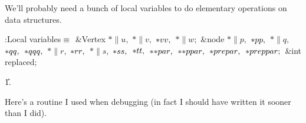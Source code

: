 We'll probably need a bunch of local variables to do elementary operations
on
data structures.

\Y\B\4:Local variables\X${}\equiv{}$\6
\&{Vertex} ${}{*}\|u,{}$ ${}{*}\|v,{}$ ${}{*}\\{vv},{}$ ${}{*}\|w;{}$\6
\&{node} ${}{*}\|p,{}$ ${}{*}\\{pp},{}$ ${}{*}\|q,{}$ ${}{*}\\{qq},{}$ ${}{*}%
\\{qqq},{}$ ${}{*}\|r,{}$ ${}{*}\\{rr},{}$ ${}{*}\|s,{}$ ${}{*}\\{ss},{}$
${}{*}\\{tt},{}$ ${}{*}{*}\\{par},{}$ ${}{*}{*}\\{ppar},{}$ ${}{*}%
\\{prepar},{}$ ${}{*}\\{preppar};{}$\6
\&{int} \\{replaced};\par
\U1.\fi

Here's a routine I used when debugging (in fact I should have written
it sooner than I did).

